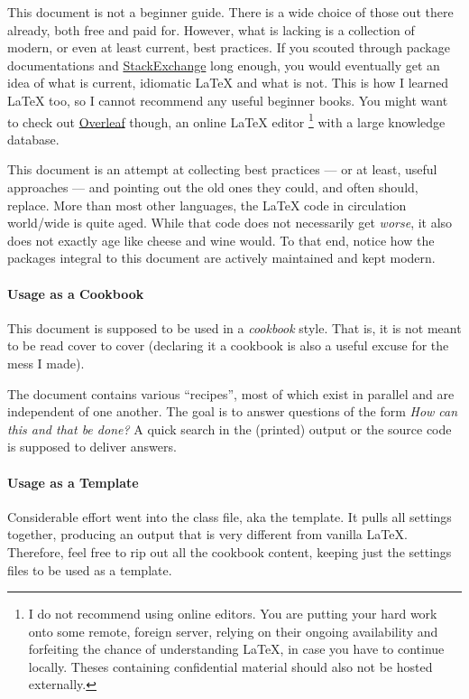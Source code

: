 
This document is not a beginner guide.
There is a wide choice of those out there already, both free and paid for.
However, what is lacking is a collection of modern, or even at least current,
best practices.
If you scouted through package documentations and
\href{https://tex.stackexchange.com/}{StackExchange}
long enough, you would eventually get an idea of what is current, idiomatic \LaTeX{}
and what is not.
This is how I learned \LaTeX{} too, so I cannot recommend any useful beginner books.
You might want to check out \href{https://www.overleaf.com/}{Overleaf} though,
an online \LaTeX{} editor%
\footnote{%
    I do not recommend using online editors.
    You are putting your hard work onto some remote, foreign server, relying on
    their ongoing availability and forfeiting the chance of understanding \LaTeX{},
    in case you have to continue locally.
    Theses containing confidential material should also not be hosted externally.
}
with a large knowledge database.

This document is an attempt at collecting best practices
--- or at least, useful approaches ---
and pointing out the old ones they could, and often should, replace.
More than most other languages, the \LaTeX{} code in circulation world\-/wide is
quite aged.
While that code does not necessarily get \emph{worse}, it also does not exactly
age like cheese and wine would.
To that end, notice how the packages integral to this document are actively
maintained and kept modern.

\paragraph{Usage as a Cookbook}
This document is supposed to be used in a \emph{cookbook} style.
That is, it is not meant to be read cover to cover
(declaring it a cookbook is also a useful excuse for the mess I made).

The document contains various \enquote{recipes}, most of which exist in parallel and
are independent of one another.
The goal is to answer questions of the form \emph{How can this and that be done?}
A quick search in the (printed) output or the source code is supposed to deliver
answers.

\paragraph{Usage as a Template}
Considerable effort went into the class file, aka the template.
It pulls all settings together, producing an output that is very different from
vanilla \LaTeX{}.
Therefore, feel free to rip out all the cookbook content, keeping just the settings
files to be used as a template.

